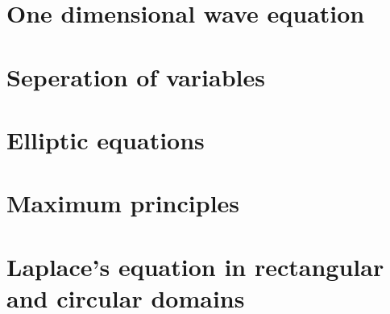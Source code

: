 \section{One dimensional wave equation}

\section{Seperation of variables}

\section{Elliptic equations}

\section{Maximum principles}

\section{Laplace's equation in rectangular and circular domains}
